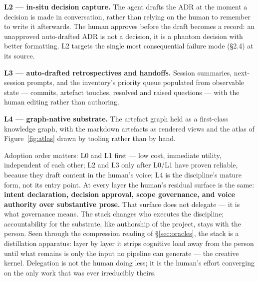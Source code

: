 \documentclass[11pt,a4paper,twocolumn]{article}
\begin{document}
\textbf{L2 --- in-situ decision capture.} The agent drafts the ADR
at the moment a decision is made in conversation, rather than
relying on the human to remember to write it afterwards. The
human approves before the draft becomes a record: an unapproved
auto-drafted ADR is not a decision, it is a phantom decision with
better formatting. L2 targets the single most consequential
failure mode (\S2.4) at its source.

\textbf{L3 --- auto-drafted retrospectives and handoffs.} Session
summaries, next-session prompts, and the inventory's priority
queue populated from observable state --- commits, artefact
touches, resolved and raised questions --- with the human editing
rather than authoring.

\textbf{L4 --- graph-native substrate.} The artefact graph held as
a first-class knowledge graph, with the markdown artefacts as
rendered views and the atlas of Figure~\ref{fig:atlas} drawn by
tooling rather than by hand.

Adoption order matters: L0 and L1 first --- low cost, immediate
utility, independent of each other; L2 and L3 only after L0/L1
have proven reliable, because they draft content in the human's
voice; L4 is the discipline's mature form, not its entry point.
At every layer the human's residual surface is the same:
\textbf{intent declaration, decision approval, scope governance,
and voice authority over substantive prose.} That surface does
not delegate --- it is what governance means. The stack changes
who executes the discipline; accountability for the substrate,
like authorship of the project, stays with the person. Seen
through the compression reading of \S\ref{sec:oracles}, the stack
is a distillation apparatus: layer by layer it strips cognitive
load away from the person until what remains is only the input no
pipeline can generate --- the creative kernel. Delegation is not
the human doing less; it is the human's effort converging on the
only work that was ever irreducibly theirs.
\end{document}
